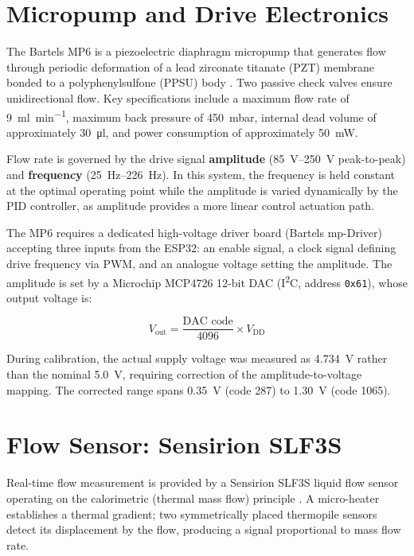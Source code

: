 \section{Micropump and Drive Electronics}

The Bartels MP6 is a piezoelectric diaphragm micropump that generates flow through periodic deformation of a lead zirconate titanate (PZT) membrane bonded to a polyphenylsulfone (PPSU) body \citep{BartelsMP6}. Two passive check valves ensure unidirectional flow. Key specifications include a maximum flow rate of \SI{9}{\milli\litre\per\minute}, maximum back pressure of \SI{450}{\milli\bar}, internal dead volume of approximately \SI{30}{\micro\litre}, and power consumption of approximately \SI{50}{\milli\watt}.

Flow rate is governed by the drive signal \textbf{amplitude} (\SIrange{85}{250}{\volt} peak-to-peak) and \textbf{frequency} (\SIrange{25}{226}{\hertz}). In this system, the frequency is held constant at the optimal operating point while the amplitude is varied dynamically by the PID controller, as amplitude provides a more linear control actuation path.

The MP6 requires a dedicated high-voltage driver board (Bartels mp-Driver) accepting three inputs from the ESP32: an enable signal, a clock signal defining drive frequency via PWM, and an analogue voltage setting the amplitude. The amplitude is set by a Microchip MCP4726 12-bit DAC (I\textsuperscript{2}C, address \texttt{0x61}), whose output voltage is:

\begin{equation}
    V_{\text{out}} = \frac{\text{DAC code}}{4096} \times V_{\text{DD}}
    \label{eq:dac}
\end{equation}

During calibration, the actual supply voltage was measured as \SI{4.734}{\volt} rather than the nominal \SI{5.0}{\volt}, requiring correction of the amplitude-to-voltage mapping. The corrected range spans \SI{0.35}{\volt} (code 287) to \SI{1.30}{\volt} (code 1065).

\section{Flow Sensor: Sensirion SLF3S}

Real-time flow measurement is provided by a Sensirion SLF3S liquid flow sensor operating on the calorimetric (thermal mass flow) principle \citep{SensirionSLF3S}. A micro-heater establishes a thermal gradient; two symmetrically placed thermopile sensors detect its displacement by the flow, producing a signal proportional to mass flow rate.

